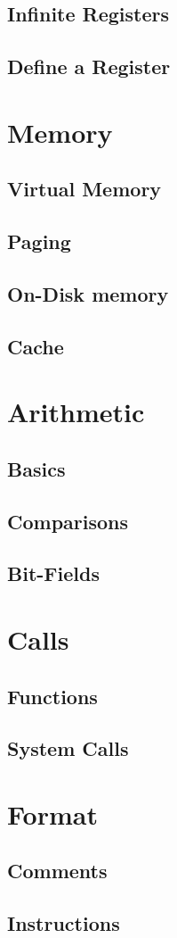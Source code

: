 \documentclass{scrartcl}
\begin{document}
        \subsection{Infinite Registers}
        \subsection{Define a Register}
    \section{Memory}
        \subsection{Virtual Memory}
        \subsection{Paging}
        \subsection{On-Disk memory}
        \subsection{Cache}
    \section{Arithmetic}
        \subsection{Basics}
        \subsection{Comparisons}
        \subsection{Bit-Fields}
    \section{Calls}
        \subsection{Functions}
        \subsection{System Calls}
    \section{Format}
        \subsection{Comments}
        \subsection{Instructions}
\end{document}
